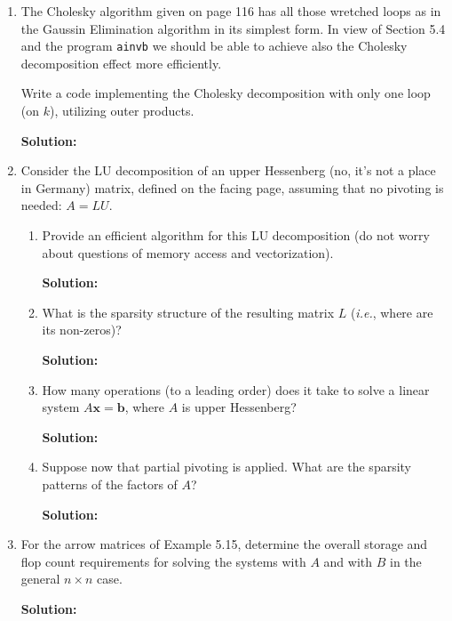 \documentclass[12pt]{article}
\begin{document}
\begin{enumerate}
\item The Cholesky algorithm given on page 116 has all those wretched loops as in the Gaussin Elimination
algorithm in its simplest form. In view of Section 5.4 and the program {\tt ainvb} we should be able to
achieve also the Cholesky decomposition effect more efficiently.

Write a code implementing the Cholesky decomposition with only one loop (on $k$), utilizing outer products.

{\bf Solution:}

\item Consider the LU decomposition of an upper Hessenberg (no, it's not a place in Germany) matrix,
defined on the facing page, assuming that no pivoting is needed: $A = LU$.

\begin{enumerate}
\item Provide an efficient algorithm for this LU decomposition (do not worry about questions of memory access and vectorization).

{\bf Solution:}

\item What is the sparsity structure of the resulting matrix $L$ ({\em i.e.}, where are its non-zeros)?

{\bf Solution:}

\item How many operations (to a leading order) does it take to solve a linear system $A\mathbf{x} = \mathbf{b}$,
where $A$ is upper Hessenberg?

{\bf Solution:}

\item Suppose now that partial pivoting is applied. What are the sparsity patterns of the factors of $A$?

{\bf Solution:}
\end{enumerate}

\item For the arrow matrices of Example 5.15, determine the overall storage and flop count requirements
for solving the systems with $A$ and with $B$ in the general $n \times n$ case.

{\bf Solution:}

\end{enumerate}
\end{document}
